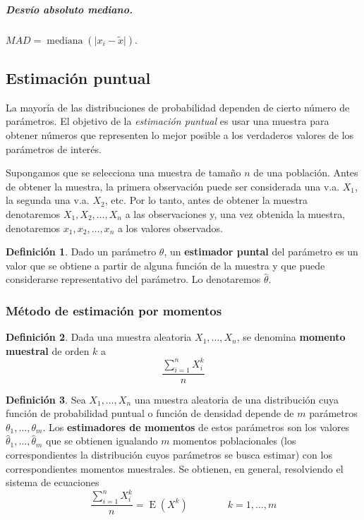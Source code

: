 \documentclass[11pt]{article}
\theoremstyle{plain}
\theoremstyle{definition}
\newtheorem*{defi}{Definición}
\theoremstyle{remark}
\newcommand{\deft}[1]{\textbf{#1}}  %
\newcommand{\esp}[0]{\ensuremath{\operatorname{E}}}  %
\begin{document}
      \subparagraph{Desvío absoluto mediano.} $MAD = \operatorname{mediana}(\vert x_i - \tilde x \vert)$.

  \subsection{Estimación puntual}

    La mayoría de las distribuciones de probabilidad dependen de cierto número de parámetros. El objetivo de la \emph{estimación puntual} es usar una muestra para obtener números que representen lo mejor posible a los verdaderos valores de los parámetros de interés.

    Supongamos que se selecciona una muestra de tamaño $n$ de una población. Antes de obtener la muestra, la primera observación puede ser considerada una v.a. $X_1$, la segunda una v.a. $X_2$, etc. Por lo tanto, antes de obtener la muestra denotaremos $X_1, X_2, \dots, X_n$ a las observaciones y, una vez obtenida la muestra, denotaremos $x_1, x_2, \dots, x_n$ a los valores observados.

    \begin{defi}
      Dado un parámetro $\theta$, un \deft{estimador puntal} del parámetro es un valor que se obtiene a partir de alguna función de la muestra y que puede considerarse representativo del parámetro. Lo denotaremos $\hat \theta$.
    \end{defi}

    \subsubsection{Método de estimación por momentos}

      \begin{defi}
        Dada una muestra aleatoria $X_1, \dots, X_n$, se denomina \deft{momento muestral} de orden $k$ a
        \[ \frac{\sum_{i = 1}^n X_i^k}{n} \]
      \end{defi}

      \begin{defi}
        Sea $X_1, \dots, X_n$ una muestra aleatoria de una distribución cuya función de probabilidad puntual o función de densidad depende de $m$ parámetros $\theta_1, \dots, \theta_m$. Los \deft{estimadores de momentos} de estos parámetros son los valores $\hat \theta_1, \dots, \hat \theta_m$ que se obtienen igualando $m$ momentos poblacionales (los correspondientes la distribución cuyos parámetros se busca estimar) con los correspondientes momentos muestrales. Se obtienen, en general, resolviendo el sistema de ecuaciones
        \[ \frac{\sum_{i=1}^n X_i^k}{n} = \esp(X^k) \qquad \qquad k = 1, \dots, m \]
      \end{defi}
\end{document}
